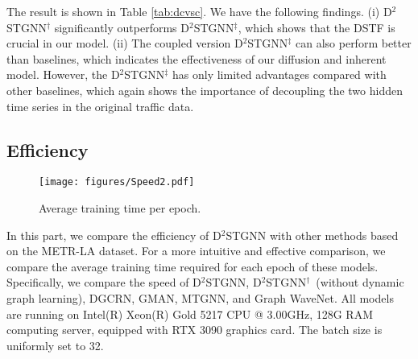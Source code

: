 \documentclass[sigconf, nonacm]{acmart}
\begin{document}
The result is shown in Table \ref{tab:dcvsc}. 
We have the following findings. 
(i) D$^2$STGNN$^\dagger$ significantly outperforms D$^2$STGNN$^\ddagger$, which shows that the DSTF is crucial in our model.
(ii) The coupled version D$^2$STGNN$^\ddagger$ can also perform better than baselines, which indicates the effectiveness of our {\color{black}diffusion and inherent} model.
However, the D$^2$STGNN$^\ddagger$ has only limited advantages compared with other baselines, {\color{black}which} again shows the importance of {\color{black}decoupling the two hidden time series in the original traffic data.} \subsection{Efficiency}
\begin{figure}[h]
\setlength{\abovecaptionskip}{0.2cm}
\centering
  \texttt{[image: figures/Speed2.pdf]}
  \caption{Average training time per epoch.}
  \label{efficiency}
\end{figure}

In this part, we compare the efficiency of D$^2$STGNN with other methods based on the METR-LA dataset.
For a more intuitive and effective comparison, we compare the average training time required for each epoch of these models.
Specifically, we compare the speed of D$^2$STGNN, D$^2$STGNN$^\dagger$~(without dynamic graph learning), DGCRN, GMAN, MTGNN, and Graph WaveNet.
All models are running on Intel(R) Xeon(R) Gold 5217 CPU @ 3.00GHz, 128G RAM computing server, equipped with RTX 3090 graphics card.
The batch size is uniformly set to 32.
\end{document}
